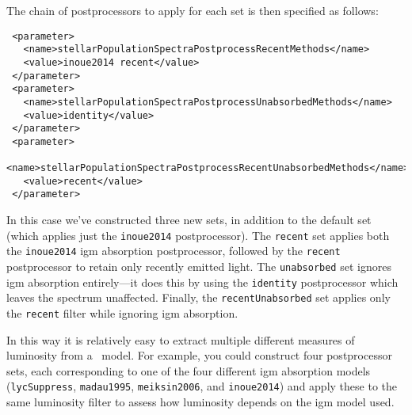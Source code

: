 The chain of postprocessors to apply for each set is then specified as follows:
\begin{verbatim}
 <parameter>
   <name>stellarPopulationSpectraPostprocessRecentMethods</name>
   <value>inoue2014 recent</value>
 </parameter>
 <parameter>
   <name>stellarPopulationSpectraPostprocessUnabsorbedMethods</name>
   <value>identity</value>
 </parameter>
 <parameter>
   <name>stellarPopulationSpectraPostprocessRecentUnabsorbedMethods</name>
   <value>recent</value>
 </parameter>
\end{verbatim}
In this case we've constructed three new sets, in addition to the default set (which applies just the {\tt inoue2014} postprocessor). The {\tt recent} set applies both the {\tt inoue2014} \gls{igm} absorption postprocessor, followed by the {\tt recent} postprocessor to retain only recently emitted light. The {\tt unabsorbed} set ignores \gls{igm} absorption entirely---it does this by using the {\tt identity} postprocessor which leaves the spectrum unaffected. Finally, the {\tt recentUnabsorbed} set applies only the {\tt recent} filter while ignoring \gls{igm} absorption.

In this way it is relatively easy to extract multiple different measures of luminosity from a \glc\ model. For example, you could construct four postprocessor sets, each corresponding to one of the four different \gls{igm} absorption models ({\tt lycSuppress}, {\tt madau1995}, {\tt meiksin2006}, and {\tt inoue2014}) and apply these to the same luminosity filter to assess how luminosity depends on the \gls{igm} model used.
